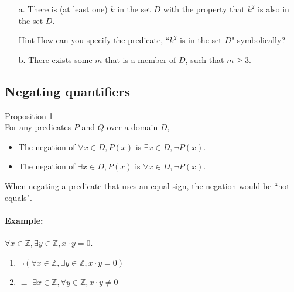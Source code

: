 {\begin{questionNOGRADE}{\thequestion}
        \begin{enumerate}
            \item[a.] There is (at least one) $k$ in the set $D$ with the property
                that $k^{2}$ is also in the set $D$.
                \begin{hint}{Hint}
                    How can you specify the predicate, ``$k^{2}$ is in the set $D$" symbolically?
                \end{hint}

            \item[b.] There exists some $m$ that is a member of $D$, such that
                $m \geq 3$.
        \end{enumerate}
    \end{questionNOGRADE}

    \hrulefill

    \subsection{Negating quantifiers}

        \begin{intro}{Proposition 1\\}
            For any predicates $P$ and $Q$ over a domain $D$,
            \begin{itemize}
                \item The negation of $\forall x \in D, P(x)$ is $\exists x \in D, \neg P(x)$.
                \item The negation of $\exists x \in D, P(x)$ is $\forall x \in D, \neg P(x)$.
            \end{itemize}

            When negating a predicate that uses an equal sign, the negation would be ``not equals".

            \paragraph{Example:} $\forall x \in \mathbb{Z}, \exists y \in \mathbb{Z}, x \cdot y = 0$.
            \begin{enumerate}
                \item $\neg( \forall x \in \mathbb{Z}, \exists y \in \mathbb{Z}, x \cdot y = 0 )$
                \item $\equiv$ \tab $\exists x \in \mathbb{Z}, \forall y \in \mathbb{Z}, x \cdot y \neq 0$
            \end{enumerate}
        \end{intro}

}
